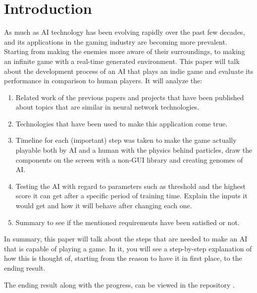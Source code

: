 \chapter{Introduction}
As much as AI technology has been evolving rapidly over the past few decades, and its applications in the gaming industry are becoming more prevalent. Starting from making the enemies more aware of their surroundings, to making an infinite game with a real-time generated environment. This paper will talk about the development process of an AI that plays an indie game and evaluate its performance in comparison to human players. It will  analyze the:

\begin{enumerate}
\item Related work of the previous papers and projects that have been published about topics that are similar in neural network technologies.
\item Technologies that have been used to make this application come true.
\item Timeline for each (important) step was taken to make the game actually playable both by AI and a human with the physics behind particles, draw the components on the screen with a non-GUI library and creating genomes of AI.
\item Testing the AI with regard to parameters such as threshold and the highest score it can get after a specific period of training time. Explain the inputs it would get and how it will behave after changing each one.
\item Summary to see if the mentioned requirements have been satisfied or not.
\end{enumerate}

In summary, this paper will talk about the steps that are needed to make an AI that is capable of playing a game. In it, you will see a step-by-step explanation of how this is thought of, starting from the reason to have it in first place, to the ending result.

The ending result along with the progress, can be viewed in the repository .